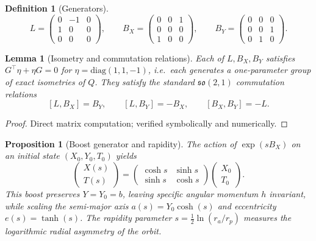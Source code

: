 \documentclass[11pt]{amsart}
\newtheorem{proposition}[theorem]{Proposition}
\newtheorem{lemma}[theorem]{Lemma}
\newtheorem{definition}[theorem]{Definition}
\begin{document}
\begin{definition}[Generators]
\[
L=\begin{pmatrix}0&-1&0\\1&0&0\\0&0&0\end{pmatrix},\qquad
B_X=\begin{pmatrix}0&0&1\\0&0&0\\1&0&0\end{pmatrix},\qquad
B_Y=\begin{pmatrix}0&0&0\\0&0&1\\0&1&0\end{pmatrix}.
\]
\end{definition}

\begin{lemma}[Isometry and commutation relations]
Each of $L,B_X,B_Y$ satisfies $G^{\!\top}\eta+\eta G=0$ for $\eta=\mathrm{diag}(1,1,-1)$, i.e.\ each generates a one-parameter group of exact isometries of $Q$. They satisfy the standard $\mathfrak{so}(2,1)$ commutation relations
\[
[L,B_X]=B_Y,\qquad [L,B_Y]=-B_X,\qquad [B_X,B_Y]=-L.
\]
\end{lemma}

\begin{proof}
Direct matrix computation; verified symbolically and numerically.
\end{proof}

\begin{proposition}[Boost generator and rapidity]\label{prop:boost}
The action of $\exp(sB_X)$ on an initial state $(X_0,Y_0,T_0)$ yields
\begin{equation}
\begin{pmatrix}X(s)\\T(s)\end{pmatrix}=\begin{pmatrix}\cosh s&\sinh s\\\sinh s&\cosh s\end{pmatrix}\begin{pmatrix}X_0\\T_0\end{pmatrix}. \tag{5}
\end{equation}
This boost preserves $Y=Y_0=b$, leaving specific angular momentum $h$ invariant, while scaling the semi-major axis $a(s)=Y_0\cosh(s)$ and eccentricity $e(s)=\tanh(s)$. The rapidity parameter $s=\tfrac12\ln(r_a/r_p)$ measures the logarithmic radial asymmetry of the orbit.
\end{proposition}
\end{document}
